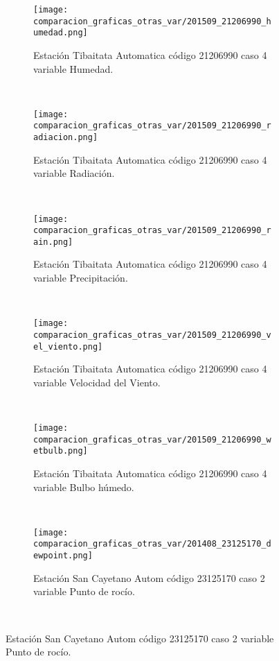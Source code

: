 \begin{figure}[H]
\centering
\begin{subfigure}[normla]{0.4\textwidth}
\caption{Estación Tibaitata Automatica código 21206990 caso 4 variable Humedad.}
\texttt{[image: comparacion\_graficas\_otras\_var/201509\_21206990\_humedad.png]}
\end{subfigure}
~
\begin{subfigure}[normla]{0.4\textwidth}
\caption{Estación Tibaitata Automatica código 21206990 caso 4 variable Radiación.}
\texttt{[image: comparacion\_graficas\_otras\_var/201509\_21206990\_radiacion.png]}
\end{subfigure}
~
\begin{subfigure}[normla]{0.4\textwidth}
\caption{Estación Tibaitata Automatica código 21206990 caso 4 variable Precipitación.}
\texttt{[image: comparacion\_graficas\_otras\_var/201509\_21206990\_rain.png]}
\end{subfigure}
~
\begin{subfigure}[normla]{0.4\textwidth}
\caption{Estación Tibaitata Automatica código 21206990 caso 4 variable Velocidad del Viento.}
\texttt{[image: comparacion\_graficas\_otras\_var/201509\_21206990\_vel\_viento.png]}
\end{subfigure}
~
\begin{subfigure}[normla]{0.4\textwidth}
\caption{Estación Tibaitata Automatica código 21206990 caso 4 variable Bulbo húmedo.}
\texttt{[image: comparacion\_graficas\_otras\_var/201509\_21206990\_wetbulb.png]}
\end{subfigure}
~
\begin{subfigure}[normla]{0.4\textwidth}
\caption{Estación San Cayetano Autom  código 23125170 caso 2 variable Punto de rocío.}
\texttt{[image: comparacion\_graficas\_otras\_var/201408\_23125170\_dewpoint.png]}
\end{subfigure}
~
\end{figure}
           
